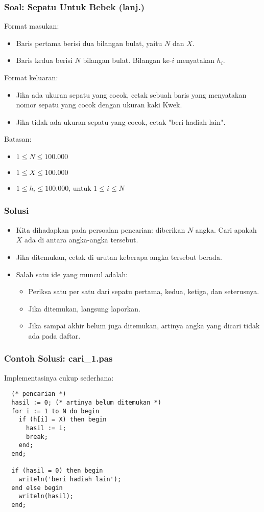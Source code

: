 \begin{frame}
\frametitle{Soal: Sepatu Untuk Bebek (lanj.)}
Format masukan:
\begin{itemize}
  \item Baris pertama berisi dua bilangan bulat, yaitu $N$ dan $X$.
  \item Baris kedua berisi $N$ bilangan bulat. Bilangan ke-$i$ menyatakan $h_i$.
\end{itemize}
Format keluaran:
\begin{itemize}
  \item Jika ada ukuran sepatu yang cocok, cetak sebuah baris yang menyatakan nomor sepatu yang cocok dengan ukuran kaki Kwek.
  \item Jika tidak ada ukuran sepatu yang cocok, cetak "beri hadiah lain".
\end{itemize}
Batasan:
\begin{itemize}
  \item $1 \le N \le 100.000$
  \item $1 \le X \le 100.000$
  \item $1 \le h_i \le 100.000$, untuk $1 \le i \le N$
\end{itemize}
\end{frame}

\begin{frame}
\frametitle{Solusi}
\begin{itemize}
  \item Kita dihadapkan pada persoalan pencarian: diberikan $N$ angka. Cari apakah $X$ ada di antara angka-angka tersebut.
  \item Jika ditemukan, cetak di urutan keberapa angka tersebut berada.
  \item Salah satu ide yang muncul adalah:
  \begin{itemize}
    \item Periksa satu per satu dari sepatu pertama, kedua, ketiga, dan seterusnya.
    \item Jika ditemukan, langsung laporkan.
    \item Jika sampai akhir belum juga ditemukan, artinya angka yang dicari tidak ada pada daftar.
  \end{itemize}
\end{itemize}
\end{frame}

\begin{frame}[fragile]
\frametitle{Contoh Solusi: cari\_1.pas}
Implementasinya cukup sederhana:
\begin{lstlisting}
  (* pencarian *)
  hasil := 0; (* artinya belum ditemukan *)
  for i := 1 to N do begin
    if (h[i] = X) then begin
      hasil := i;
      break;
    end;
  end;

  if (hasil = 0) then begin
    writeln('beri hadiah lain');
  end else begin
    writeln(hasil);
  end;
\end{lstlisting}
\end{frame}

